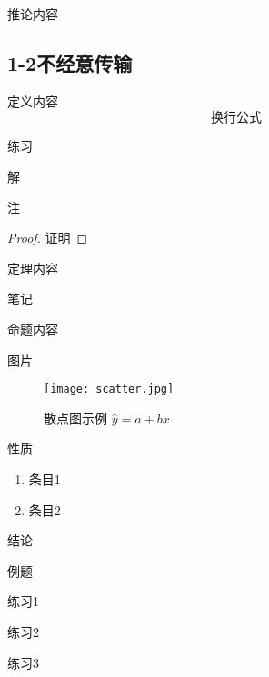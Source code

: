 \documentclass[lang=cn,newtx,10pt,scheme=chinese]{elegantbook}
\begin{document}
\begin{corollary}[推论名称] \label{thm:Rabin} 
	推论内容
\end{corollary}


\subsection{1-2不经意传输}


\begin{definition}[定义名称] \label{def:int} 
	定义内容
	\begin{equation}
		换行公式
	\end{equation}
\end{definition}

\begin{exercise}\label{exer:43}
	练习
\end{exercise}

\begin{solution}
	解
\end{solution}

\begin{remark}
	注
\end{remark}

\begin{proof}
	证明
\end{proof}

\begin{theorem}[定理名称] \label{thm:fubi} 
	定理内容
\end{theorem}

\begin{note}
	笔记
\end{note}

\begin{proposition}[命题名称] \label{pro:max}
	命题内容
\end{proposition}

图片
\begin{figure}[htbp]
	\centering
	\texttt{[image: scatter.jpg]}
	\caption{散点图示例 $\hat{y}=a+bx$ \label{fig:scatter}}
\end{figure}

\begin{property}\label{property:cauchy}
	性质
	\begin{enumerate}
		\item 条目1
		\item 条目2
	\end{enumerate}
\end{property}

\begin{conclusion}
	结论
\end{conclusion}

\begin{example}
	例题
\end{example}

\begin{problemset}
	\item 练习1
	\item 练习2
	\item 练习3
\end{problemset}
	
\end{document}
